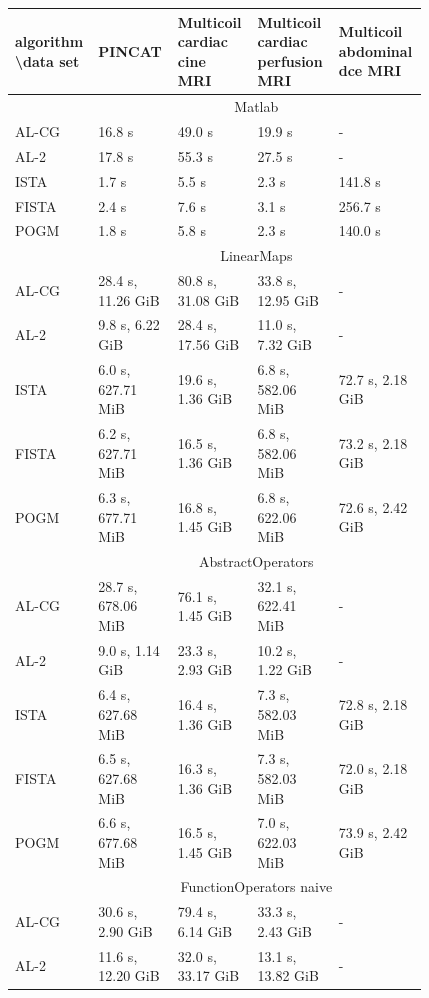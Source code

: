 \begin{table}
\footnotesize
\begin{tabular}{|p{0.1\linewidth}|p{0.18\linewidth}p{0.18\linewidth}p{0.18\linewidth}p{0.18\linewidth}|}
\hline
algorithm \textbackslash data set & PINCAT & Multicoil cardiac cine MRI & Multicoil cardiac perfusion MRI & Multicoil abdominal dce MRI \\ \hline
\multicolumn{1}{|c|}{} & \multicolumn{4}{c|}{Matlab} \\
AL-CG & 16.8 s & 49.0 s & 19.9 s & - \\
AL-2 & 17.8 s & 55.3 s & 27.5 s & - \\
ISTA & 1.7 s & 5.5 s & 2.3 s & 141.8 s \\
FISTA & 2.4 s & 7.6 s & 3.1 s & 256.7 s \\
POGM & 1.8 s & 5.8 s & 2.3 s & 140.0 s \\ \hline
\multicolumn{1}{|c|}{} & \multicolumn{4}{c|}{LinearMaps} \\
AL-CG & 28.4 s, 11.26 GiB & 80.8 s, 31.08 GiB & 33.8 s, 12.95 GiB & - \\
AL-2 & 9.8 s, 6.22 GiB & 28.4 s, 17.56 GiB & 11.0 s, 7.32 GiB & - \\
ISTA & 6.0 s, 627.71 MiB & 19.6 s, 1.36 GiB & 6.8 s, 582.06 MiB & 72.7 s, 2.18 GiB \\
FISTA & 6.2 s, 627.71 MiB & 16.5 s, 1.36 GiB & 6.8 s, 582.06 MiB & 73.2 s, 2.18 GiB \\
POGM & 6.3 s, 677.71 MiB & 16.8 s, 1.45 GiB & 6.8 s, 622.06 MiB & 72.6 s, 2.42 GiB \\ \hline
\multicolumn{1}{|c|}{} & \multicolumn{4}{c|}{AbstractOperators} \\
AL-CG & 28.7 s, 678.06 MiB & 76.1 s, 1.45 GiB & 32.1 s, 622.41 MiB & - \\
AL-2 & 9.0 s, 1.14 GiB & 23.3 s, 2.93 GiB & 10.2 s, 1.22 GiB & - \\
ISTA & 6.4 s, 627.68 MiB & 16.4 s, 1.36 GiB & 7.3 s, 582.03 MiB & 72.8 s, 2.18 GiB \\
FISTA & 6.5 s, 627.68 MiB & 16.3 s, 1.36 GiB & 7.3 s, 582.03 MiB & 72.0 s, 2.18 GiB \\
POGM & 6.6 s, 677.68 MiB & 16.5 s, 1.45 GiB & 7.0 s, 622.03 MiB & 73.9 s, 2.42 GiB \\ \hline
\multicolumn{1}{|c|}{} & \multicolumn{4}{c|}{FunctionOperators naive} \\
AL-CG & 30.6 s, 2.90 GiB & 79.4 s, 6.14 GiB & 33.3 s, 2.43 GiB & - \\
AL-2 & 11.6 s, 12.20 GiB & 32.0 s, 33.17 GiB & 13.1 s, 13.82 GiB & - \\

\end{tabular}
\end{table}
